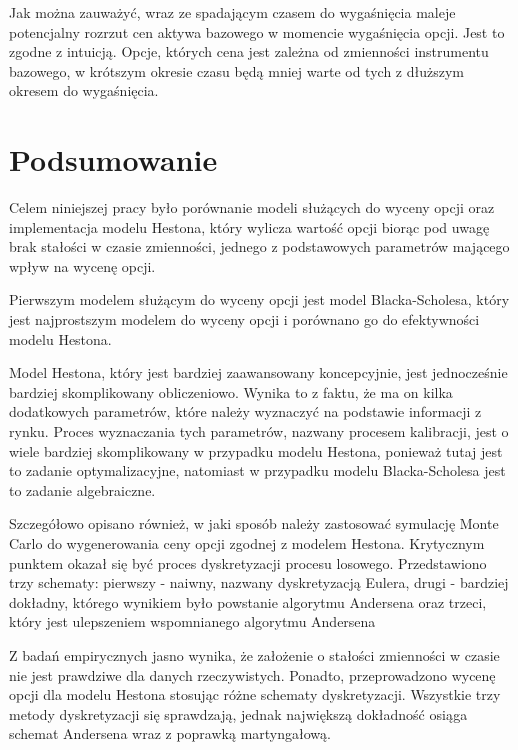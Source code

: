 \documentclass{pracamgr}
\begin{document}
Jak można zauważyć, wraz ze spadającym czasem do wygaśnięcia maleje potencjalny rozrzut cen aktywa 
bazowego w momencie wygaśnięcia opcji.
Jest to zgodne z intuicją. Opcje, których cena jest zależna od zmienności instrumentu bazowego, 
w krótszym okresie czasu będą mniej warte od tych z dłuższym okresem do wygaśnięcia.






\cleardoublepage
{}
\chapter*{Podsumowanie}\label{r:ending}
 

Celem niniejszej pracy było porównanie modeli służących do wyceny
opcji oraz implementacja modelu Hestona, który wylicza wartość opcji biorąc
pod uwagę brak stałości w czasie zmienności, jednego z podstawowych parametrów
mającego wpływ na wycenę opcji. 

Pierwszym modelem służącym do wyceny opcji jest model Blacka-Scholesa, który jest
najprostszym modelem do wyceny opcji i porównano go do efektywności modelu 
Hestona. 

Model Hestona, który jest bardziej zaawansowany koncepcyjnie, jest jednocześnie 
bardziej skomplikowany obliczeniowo. Wynika to z faktu, że ma on kilka dodatkowych
parametrów, które należy wyznaczyć na podstawie informacji z rynku. Proces wyznaczania tych 
parametrów, nazwany procesem kalibracji, jest o wiele bardziej skomplikowany w przypadku 
modelu Hestona, ponieważ tutaj jest to zadanie optymalizacyjne, natomiast w przypadku modelu
Blacka-Scholesa jest to zadanie algebraiczne.

Szczegółowo opisano również, w jaki sposób należy zastosować symulację Monte Carlo do 
wygenerowania ceny opcji zgodnej z modelem Hestona. Krytycznym punktem okazał się być
proces dyskretyzacji procesu losowego. Przedstawiono trzy schematy: pierwszy - naiwny, nazwany
dyskretyzacją Eulera, drugi - bardziej dokładny, którego wynikiem było powstanie 
algorytmu Andersena oraz trzeci, który jest ulepszeniem wspomnianego algorytmu 
Andersena

Z badań empirycznych jasno wynika, że założenie o stałości zmienności w czasie nie jest 
prawdziwe dla danych rzeczywistych. Ponadto, przeprowadzono wycenę opcji 
dla modelu Hestona stosując różne schematy dyskretyzacji.
Wszystkie trzy metody dyskretyzacji się 
sprawdzają, jednak największą dokładność osiąga schemat Andersena wraz
z poprawką martyngałową.
\end{document}
